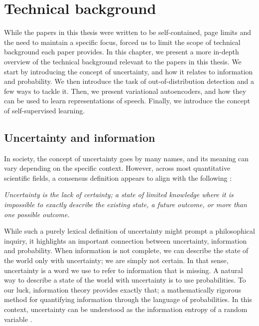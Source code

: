 

\chapter[technical background]{Technical background}\label{chp:technical-background}

While the papers in this thesis were written to be self-contained, page limits and the need to maintain a specific focus, forced us to limit the scope of technical background each paper provides. In this chapter, we present a more in-depth overview of the technical background relevant to the papers in this thesis. 
We start by introducing the concept of uncertainty, and how it relates to information and probability. We then introduce the task of out-of-distribution detection and a few ways to tackle it.
Then, we present variational autoencoders, and how they can be used to learn representations of speech. Finally, we introduce the concept of self-supervised learning.


\section{Uncertainty and information}

In society, the concept of uncertainty goes by many names, and its meaning can vary depending on the specific context. However, across most quantitative scientific fields, a consensus definition appears to align with the following \cite{hubbard_how_2014}:
%
\begin{center}
    \textit{Uncertainty is the lack of certainty; a state of limited knowledge where it is impossible to exactly describe the existing state, a future outcome, or more than one possible outcome.}
\end{center}
%
While such a purely lexical definition of uncertainty might prompt a philosophical inquiry, it highlights an important connection between uncertainty, information and probability. When information is not complete, we can describe the state of the world only with uncertainty; we are simply not certain. In that sense, uncertainty is a word we use to refer to information that is missing. A natural way to describe a state of the world with uncertainty is to use probabilities. To our luck, information theory provides exactly that; a mathematically rigorous method for quantifying information through the language of probabilities. In this context, uncertainty can be understood as the information entropy of a random variable \cite{mackay_information_2003}. 


